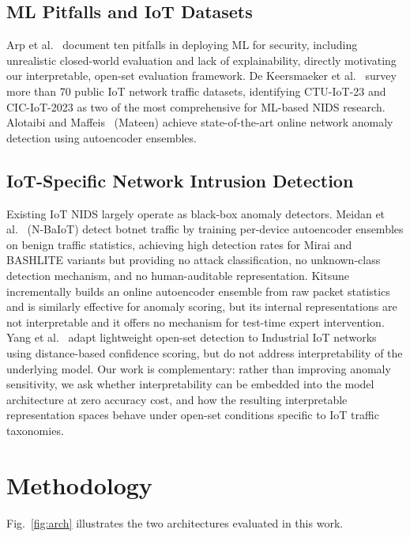 \documentclass[journal]{IEEEtran}
\begin{document}
\subsection{ML Pitfalls and IoT Datasets}

Arp et al.~\cite{arp2022dos} document ten pitfalls in deploying ML for
security, including unrealistic closed-world evaluation and lack of
explainability, directly motivating our interpretable, open-set
evaluation framework.
De Keersmaeker et al.~\cite{dekeersmaeker2023survey} survey more than
70 public IoT network traffic datasets, identifying CTU-IoT-23 and
CIC-IoT-2023 as two of the most comprehensive for ML-based NIDS
research.
Alotaibi and Maffeis~\cite{alotaibi2024mateen} (Mateen) achieve
state-of-the-art online network anomaly detection using autoencoder
ensembles.

\subsection{IoT-Specific Network Intrusion Detection}

Existing IoT NIDS largely operate as black-box anomaly detectors.
Meidan et al.~\cite{meidan2018nbaiot} (N-BaIoT) detect botnet traffic
by training per-device autoencoder ensembles on benign traffic
statistics, achieving high detection rates for Mirai and BASHLITE
variants but providing no attack classification, no unknown-class
detection mechanism, and no human-auditable representation.
Kitsune~\cite{mirsky2018kitsune} incrementally builds an online
autoencoder ensemble from raw packet statistics and is similarly
effective for anomaly scoring, but its internal representations are not
interpretable and it offers no mechanism for test-time expert
intervention.
Yang et al.~\cite{yang2025openset} adapt lightweight open-set detection
to Industrial IoT networks using distance-based confidence scoring, but
do not address interpretability of the underlying model.
Our work is complementary: rather than improving anomaly sensitivity, we
ask whether interpretability can be embedded into the model architecture
at zero accuracy cost, and how the resulting interpretable representation
spaces behave under open-set conditions specific to IoT traffic
taxonomies.

\section{Methodology}

Fig.~\ref{fig:arch} illustrates the two architectures evaluated in this
work.
\end{document}

